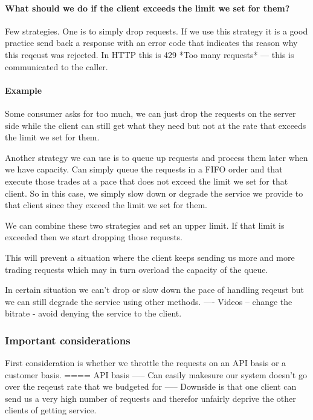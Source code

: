 \paragraph{What should we do if the client exceeds the limit we set for them?}
Few strategies.
One is to simply drop requests.
If we use this strategy it is a good practice send back a response with an error code that indicates ths reason why this reqeust was rejected.
In HTTP this is 429 *Too many requests* --- this is communicated to the caller.

\paragraph{Example}
Some consumer asks for too much, we can just drop the requests on the server side while the client can still get what they need but not at the rate that exceeds the limit we set for them.

Another strategy we can use is to queue up requests and process them later when we have capacity.
Can simply queue the requests in a FIFO order and that execute those trades at a pace that does not exceed the limit we set for that client.
So in this case, we simply slow down or degrade the service we provide to that client since they exceed the limit we set for them.

We can combine these two strategies and set an upper limit.
If that limit is exceeded then we start dropping those requests.

This will prevent a situation where the client keeps sending us more and more trading requests which may in turn overload the capacity of the queue.

In certain situation we can't drop or slow down the pace of handling reqeust but we can still degrade the service using other methods.
---- Videos -- change the bitrate - avoid denying the service to the client.

\subsubsection{Important considerations}
First consideration is whether we throttle the requests on an API basis or a customer basis.
==== API basis
----- Can easily makesure our system doesn't go over the reqeust rate that we budgeted for
----- Downside is that one client can send us a very high number of requests and therefor unfairly deprive the other clients of getting service.

